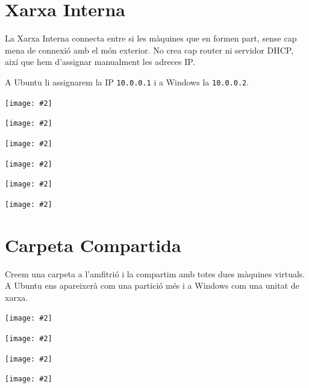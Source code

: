 \documentclass[a4paper,12pt]{article}
\newcommand{\mygraphic}[2][height=0.45\textheight]{\begin{center}
		\centering\texttt{[image: \#2]}\par
\end{center}}
\begin{document}
\newpage
\section{Xarxa Interna}
La Xarxa Interna connecta entre si les màquines que en formen part, sense cap mena de connexió amb el món exterior. No crea cap router ni servidor DHCP, així que hem d'assignar manualment les adreces IP.

A Ubuntu li assignarem la IP \texttt{10.0.0.1} i a Windows la  \texttt{10.0.0.2}.

\mygraphic{imatges/d1.png}
\mygraphic{imatges/d2.png}
\mygraphic{imatges/d3.png}
\mygraphic{imatges/d4.png}
\mygraphic{imatges/d5.png}
\mygraphic{imatges/d6.png}

\section{Carpeta Compartida}
Creem una carpeta a l'amfitrió i la compartim amb totes dues màquines virtuals. A Ubuntu ens apareixerà com una partició més i a Windows com una unitat de xarxa.

\mygraphic[height=0.4\textheight]{imatges/f0.png}
\mygraphic[height=0.4\textheight]{imatges/f1.png}
\mygraphic[height=0.4\textheight]{imatges/e1.png}
\mygraphic[height=0.4\textheight]{imatges/e2.png}
\end{document}
